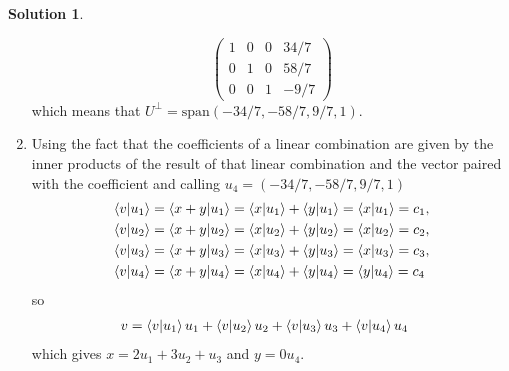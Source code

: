 \documentclass[10pt]{article}
\theoremstyle{definition}
\newtheorem{soln}{Solution}
\begin{document}
\begin{soln}
\begin{enumerate}[label=(\alph*)]
$$\begin{pmatrix}
              1 & 0 & 0 & 34/7 \\
              0 & 1 & 0 & 58/7 \\
              0 & 0 & 1 & -9/7
            \end{pmatrix}$$
          which means that $U^\perp=\mathrm{span}(-34/7,-58/7,9/7,1)$.
    \item Using the fact that the coefficients of a linear combination are given by the inner products of the result of that linear combination and the vector paired with the coefficient
          and calling $u_4=(-34/7,-58/7,9/7,1)$
          \begin{align*}
            \braket{v}{u_1} & =\braket{x+y}{u_1}=\braket{x}{u_1}+\braket{y}{u_1}=\braket{x}{u_1}=c_1, \\
            \braket{v}{u_2} & =\braket{x+y}{u_2}=\braket{x}{u_2}+\braket{y}{u_2}=\braket{x}{u_2}=c_2, \\
            \braket{v}{u_3} & =\braket{x+y}{u_3}=\braket{x}{u_3}+\braket{y}{u_3}=\braket{x}{u_3}=c_3, \\
            \braket{v}{u_4} & =\braket{x+y}{u_4}=\braket{x}{u_4}+\braket{y}{u_4}=\braket{y}{u_4}=c_4
          \end{align*} so
          \begin{align*}
            v & =\braket{v}{u_1}u_1+\braket{v}{u_2}u_2+\braket{v}{u_3}u_3+\braket{v}{u_4}u_4
          \end{align*}
          which gives $x=2u_1+3u_2+u_3$ and $y=0u_4$.
  \end{enumerate}
\end{soln}
\end{document}
